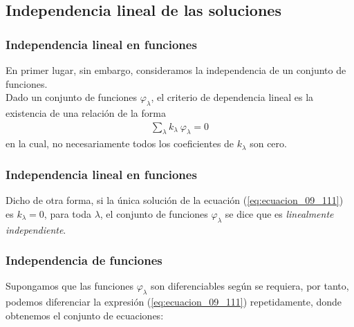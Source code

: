 \subsection{Independencia lineal de las soluciones}
\begin{frame}
\frametitle{Independencia lineal en funciones}
En primer lugar, sin embargo, consideramos la independencia de un conjunto de funciones.
\\
\bigskip
Dado un conjunto de funciones $\varphi_{\lambda}$, el criterio de dependencia lineal es la existencia de una relación de la forma
{\fontsize{12}{12}\selectfont
\begin{align}
\sum_{\lambda} k_{\lambda} \: \varphi_{\lambda} = 0 
\label{eq:ecuacion_09_111}
\end{align}
}
en la cual, no necesariamente todos los coeficientes de $k_{\lambda}$ son cero.
\end{frame}
\begin{frame}
\frametitle{Independencia lineal en funciones}
Dicho de otra forma, si la única solución de la ecuación (\ref{eq:ecuacion_09_111}) es $k_{\lambda} = 0$, para toda $\lambda$, el conjunto de funciones $\varphi_{\lambda}$ se dice que es \emph{linealmente independiente}.
\end{frame}
\begin{frame}
\frametitle{Independencia de funciones}
Supongamos que las funciones $\varphi_{\lambda}$ son diferenciables según se requiera, por tanto, podemos diferenciar la expresión (\ref{eq:ecuacion_09_111}) repetidamente, donde obtenemos el conjunto de ecuaciones:
\end{frame}
